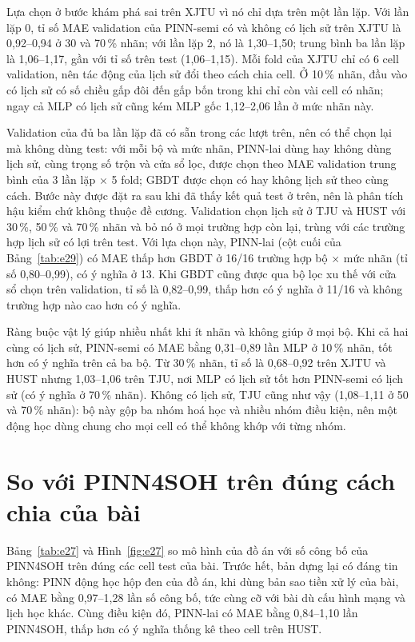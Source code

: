 \documentclass[12pt,a4paper,oneside]{report}
\theoremstyle{plain}
\theoremstyle{definition}
\begin{document}
Lựa chọn ở bước khám phá sai trên XJTU vì nó chỉ dựa trên một lần lặp. Với lần lặp 0, tỉ số MAE validation của
PINN-semi có và không có lịch sử trên XJTU là 0{,}92--0{,}94 ở 30 và 70\,\% nhãn; với lần lặp 2, nó là 1{,}30--1{,}50; trung bình ba
lần lặp là 1{,}06--1{,}17, gần với tỉ số trên test (1{,}06--1{,}15). Mỗi fold của XJTU chỉ có 6 cell validation, nên tác động của lịch sử
đổi theo cách chia cell. Ở 10\,\% nhãn, đầu vào có lịch sử có số chiều gấp đôi đến gấp bốn trong khi chỉ còn vài cell có
nhãn; ngay cả MLP có lịch sử cũng kém MLP gốc 1{,}12--2{,}06 lần ở mức nhãn này.

Validation của đủ ba lần lặp đã có sẵn trong các lượt trên, nên có thể chọn lại mà không dùng test: với mỗi bộ và mức
nhãn, PINN-lai dùng hay không dùng lịch sử, cùng trọng số trộn và cửa sổ lọc, được chọn theo MAE validation trung bình
của 3 lần lặp $\times$ 5 fold; GBDT được chọn có hay không lịch sử theo cùng cách. Bước này được đặt ra sau khi đã thấy
kết quả test ở trên, nên là phân tích hậu kiểm chứ không thuộc đề cương. Validation chọn lịch sử ở TJU và HUST với
30\,\%, 50\,\% và 70\,\% nhãn và bỏ nó ở mọi trường hợp còn lại, trùng với các trường hợp lịch sử có lợi trên test. Với lựa chọn này,
PINN-lai (cột cuối của Bảng~\ref{tab:e29}) có MAE thấp hơn GBDT ở 16/16 trường hợp bộ $\times$ mức nhãn (tỉ số
0{,}80--0{,}99), có ý nghĩa ở 13. Khi GBDT cũng được qua
bộ lọc xu thế với cửa sổ chọn trên validation, tỉ số là 0{,}82--0{,}99, thấp hơn có ý nghĩa ở 11/16 và không trường hợp nào cao hơn có ý nghĩa.


Ràng buộc vật lý giúp nhiều nhất khi ít nhãn và không giúp ở mọi bộ. Khi cả hai cùng có lịch
sử, PINN-semi có MAE bằng 0{,}31--0{,}89 lần MLP ở 10\,\% nhãn, tốt hơn có ý nghĩa trên cả ba bộ. Từ 30\,\% nhãn, tỉ số là 0{,}68--0{,}92 trên XJTU và HUST nhưng
1{,}03--1{,}06 trên TJU, nơi MLP có lịch sử tốt hơn PINN-semi có lịch sử (có ý nghĩa ở 70\,\% nhãn). Không có lịch sử,
TJU cũng như vậy
(1{,}08--1{,}11 ở 50 và 70\,\% nhãn): bộ này gộp ba nhóm hoá học và nhiều nhóm điều kiện, nên một động học dùng chung cho
mọi cell có thể không khớp với từng nhóm.

\section{So với PINN4SOH trên đúng cách chia của bài}\label{sec:paperres}

Bảng~\ref{tab:e27} và Hình~\ref{fig:e27} so mô hình của đồ án với số công bố của PINN4SOH trên đúng các cell test của
bài. Trước hết, bản dựng lại có đáng tin không: PINN động học hộp đen của đồ án, khi dùng bản sao tiền xử lý của bài, có
MAE bằng 0{,}97--1{,}28 lần số công bố, tức cùng cỡ với bài dù cấu hình mạng và lịch học khác. Cùng điều kiện đó, PINN-lai có
MAE bằng 0{,}84--1{,}10 lần PINN4SOH, thấp hơn có ý nghĩa thống kê theo cell trên HUST.
\end{document}
